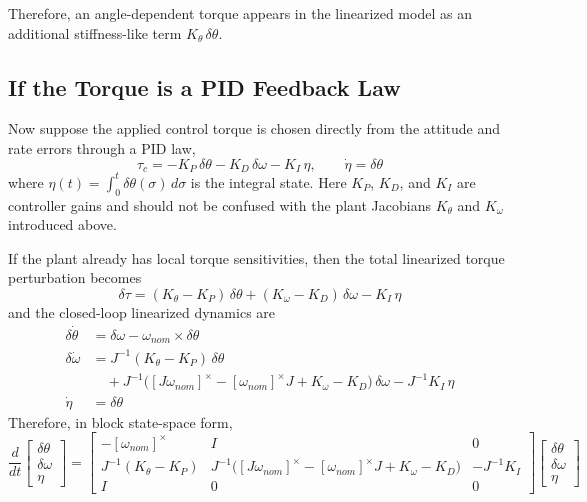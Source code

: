 \documentclass[11pt]{article}
\begin{document}
Therefore, an angle-dependent torque appears in the linearized model as an additional stiffness-like term $K_{\theta} \, \delta\theta$.

\subsection{If the Torque is a PID Feedback Law}
Now suppose the applied control torque is chosen directly from the attitude and rate errors through a PID law,
\begin{equation}
    \tau_{c} = -K_{P} \, \delta\theta - K_{D} \, \delta\omega - K_{I} \, \eta,
    \qquad
    \dot{\eta} = \delta\theta
\end{equation}
where $\eta(t) = \int_{0}^{t} \delta\theta(\sigma) \, d\sigma$ is the integral state. Here $K_{P}$, $K_{D}$, and $K_{I}$ are controller gains and should not be confused with the plant Jacobians $K_{\theta}$ and $K_{\omega}$ introduced above.

If the plant already has local torque sensitivities, then the total linearized torque perturbation becomes
\begin{equation}
    \delta\tau = (K_{\theta} - K_{P}) \, \delta\theta + (K_{\omega} - K_{D}) \, \delta\omega - K_{I} \, \eta
\end{equation}
and the closed-loop linearized dynamics are
\begin{align}
    \delta\dot{\theta} &= \delta\omega - \omega_{nom} \times \delta\theta \\
    \delta\dot{\omega} &= J^{-1} (K_{\theta} - K_{P}) \, \delta\theta \\
    &\quad + J^{-1} \Big( [J\omega_{nom}]^\times - [\omega_{nom}]^\times J + K_{\omega} - K_{D} \Big) \, \delta\omega - J^{-1} K_{I} \, \eta \\
    \dot{\eta} &= \delta\theta
\end{align}
Therefore, in block state-space form,
\begin{equation}
    \frac{d}{dt}
    \begin{bmatrix}
        \delta\theta \\
        \delta\omega \\
        \eta
    \end{bmatrix}
    =
    \begin{bmatrix}
        -[\omega_{nom}]^\times & I & 0 \\
        J^{-1}(K_{\theta} - K_{P}) & J^{-1} \Big( [J\omega_{nom}]^\times - [\omega_{nom}]^\times J + K_{\omega} - K_{D} \Big) & -J^{-1} K_{I} \\
        I & 0 & 0
    \end{bmatrix}
    \begin{bmatrix}
        \delta\theta \\
        \delta\omega \\
        \eta
    \end{bmatrix}
\end{equation}
\end{document}
